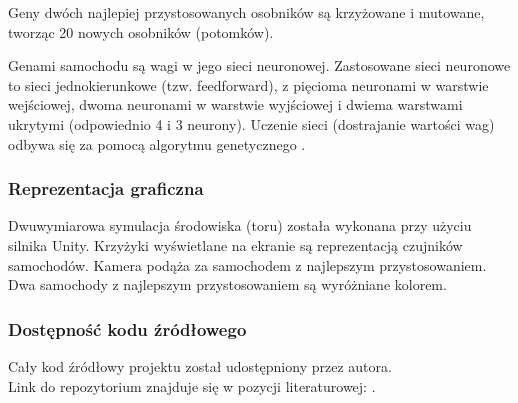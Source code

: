 Geny dwóch najlepiej przystosowanych osobników są krzyżowane i mutowane, tworząc 20 nowych osobników (potomków).

Genami samochodu są wagi w jego sieci neuronowej.
Zastosowane sieci neuronowe to sieci jednokierunkowe (tzw. feedforward),
z pięcioma neuronami w warstwie wejściowej, dwoma neuronami w warstwie wyjściowej i dwiema warstwami ukrytymi (odpowiednio 4 i 3 neurony).
Uczenie sieci (dostrajanie wartości wag) odbywa się za pomocą algorytmu genetycznego \cite{geneticAlgorithm:introduction}.

\subsubsection{Reprezentacja graficzna}
Dwuwymiarowa symulacja środowiska (toru) została wykonana przy użyciu silnika Unity.
Krzyżyki wyświetlane na ekranie są reprezentacją czujników samochodów.
Kamera podąża za samochodem z najlepszym przystosowaniem.
Dwa samochody z najlepszym przystosowaniem są wyróżniane kolorem.

\subsubsection{Dostępność kodu źródłowego}
Cały kod źródłowy projektu został udostępniony przez autora. \\
Link do repozytorium znajduje się w pozycji literaturowej: \cite{artz:deepLearningCars:github}.